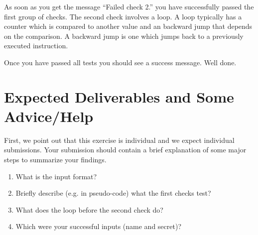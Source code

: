 \documentclass[a4paper,11pt]{article}
\begin{document}
As soon as you get the message ``Failed check 2.'' you have successfully passed
the first group of checks. The second check involves a loop. A loop typically
has a counter which is compared to another value and an backward jump that
depends on the comparison. A backward jump is one which jumps back to a
previously executed instruction.

Once you have passed all tests you should see a success message. Well done.


\section*{Expected Deliverables and Some Advice/Help}

First, we point out that this exercise is individual and we expect individual
submissions. Your submission should contain a brief explanation of some major
steps to summarize your findings.

\begin{enumerate}
\item What is the input format?
\item Briefly describe (e.g. in pseudo-code) what the first checks test?
\item What does the loop before the second check do?
\item Which were your successful inputs (name and secret)?
\end{enumerate}
\end{document}
